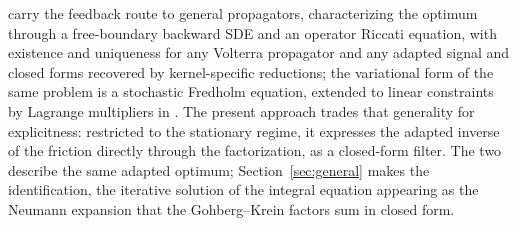 \documentclass[11pt]{article}
\theoremstyle{plain}
\theoremstyle{definition}
\theoremstyle{remark}
\begin{document}
\citet{AbiJaberNeuman2025} carry the feedback route to general propagators, characterizing the optimum through a free-boundary backward SDE and an operator Riccati equation, with existence and uniqueness for any Volterra propagator and any adapted signal and closed forms recovered by kernel-specific reductions; the variational form of the same problem is a stochastic Fredholm equation, extended to linear constraints by Lagrange multipliers in \citet{AbiJaberDeCarvalhoPham2024}. The present approach trades that generality for explicitness: restricted to the stationary regime, it expresses the adapted inverse of the friction directly through the factorization, as a closed-form filter. The two describe the same adapted optimum; Section~\ref{sec:general} makes the identification, the iterative solution of the integral equation appearing as the Neumann expansion that the Gohberg--Krein factors sum in closed form.
\end{document}
